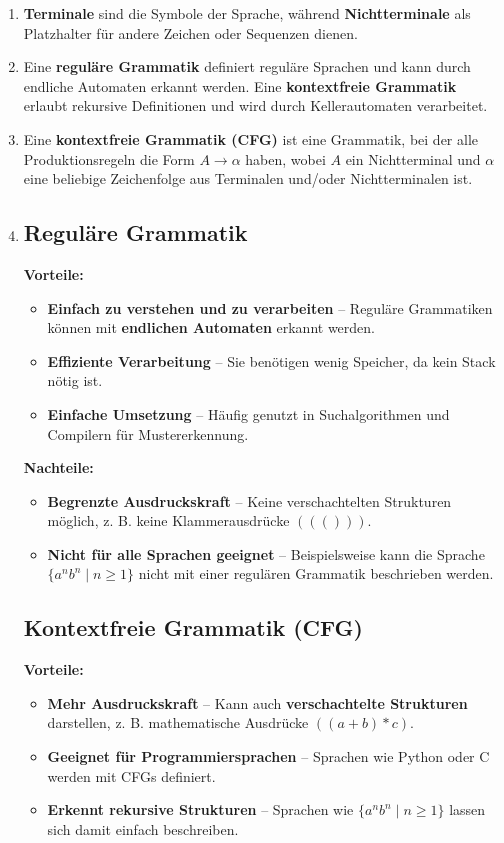 \documentclass[a4paper,12pt]{article}
\begin{document}
\begin{enumerate}
	\item \textbf{Terminale} sind die Symbole der Sprache, während \textbf{Nichtterminale} als Platzhalter für andere Zeichen oder Sequenzen dienen.
			\item Eine \textbf{reguläre Grammatik} definiert reguläre Sprachen und kann durch endliche Automaten erkannt werden. Eine \textbf{kontextfreie Grammatik} erlaubt rekursive Definitionen und wird durch Kellerautomaten verarbeitet.
	
	\item Eine \textbf{kontextfreie Grammatik (CFG)} ist eine Grammatik, bei der alle Produktionsregeln die Form $A \rightarrow \alpha$ haben, wobei $A$ ein Nichtterminal und $\alpha$ eine beliebige Zeichenfolge aus Terminalen und/oder Nichtterminalen ist.
	
	\item \subsection*{Reguläre Grammatik}
	\textbf{Vorteile:}
	\begin{itemize}
		\item \textbf{Einfach zu verstehen und zu verarbeiten} – Reguläre Grammatiken können mit \textbf{endlichen Automaten} erkannt werden.
		\item \textbf{Effiziente Verarbeitung} – Sie benötigen wenig Speicher, da kein Stack nötig ist.
		\item \textbf{Einfache Umsetzung} – Häufig genutzt in Suchalgorithmen und Compilern für Mustererkennung.
	\end{itemize}
	
	\textbf{Nachteile:}
	\begin{itemize}
		\item \textbf{Begrenzte Ausdruckskraft} – Keine verschachtelten Strukturen möglich, z. B. keine Klammerausdrücke $((()))$.
		\item \textbf{Nicht für alle Sprachen geeignet} – Beispielsweise kann die Sprache $\{ a^n b^n \mid n \geq 1 \}$ nicht mit einer regulären Grammatik beschrieben werden.
	\end{itemize}
	
	\subsection*{Kontextfreie Grammatik (CFG)}
	\textbf{Vorteile:}
	\begin{itemize}
		\item \textbf{Mehr Ausdruckskraft} – Kann auch \textbf{verschachtelte Strukturen} darstellen, z. B. mathematische Ausdrücke $((a + b) * c)$.
		\item \textbf{Geeignet für Programmiersprachen} – Sprachen wie Python oder C werden mit CFGs definiert.
		\item \textbf{Erkennt rekursive Strukturen} – Sprachen wie $\{ a^n b^n \mid n \geq 1 \}$ lassen sich damit einfach beschreiben.
	\end{itemize}
	

\end{enumerate}
\end{document}
